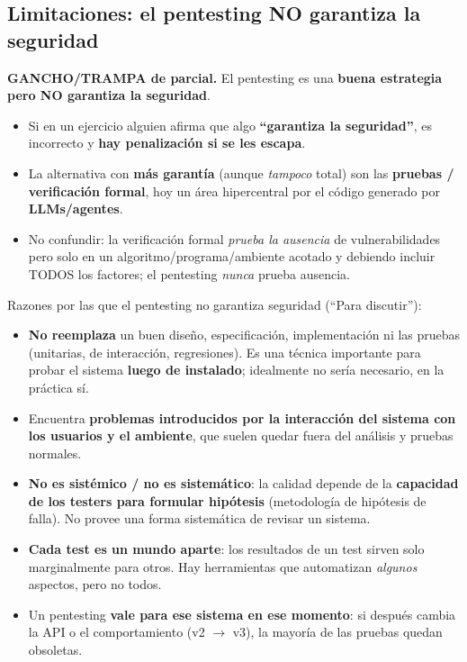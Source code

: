 \documentclass[../main.tex]{subfiles}
\begin{document}
\subsection{Limitaciones: el pentesting NO garantiza la seguridad}

\begin{examen}
\faExclam \textbf{GANCHO/TRAMPA de parcial.} El pentesting es una \textbf{buena estrategia
pero NO garantiza la seguridad}.
\begin{itemize}
    \item Si en un ejercicio alguien afirma que algo \textbf{``garantiza la seguridad''}, es
    incorrecto y \textbf{hay penalización si se les escapa}.
    \item La alternativa con \textbf{más garantía} (aunque \emph{tampoco} total) son las
    \textbf{pruebas / verificación formal}, hoy un área hipercentral por el código generado por
    \textbf{LLMs/agentes}.
    \item No confundir: la verificación formal \emph{prueba la ausencia} de vulnerabilidades
    pero solo en un algoritmo/programa/ambiente acotado y debiendo incluir TODOS los factores;
    el pentesting \emph{nunca} prueba ausencia.
\end{itemize}
\end{examen}

Razones por las que el pentesting no garantiza seguridad (``Para discutir''):
\begin{itemize}
    \item \textbf{No reemplaza} un buen diseño, especificación, implementación ni las pruebas
    (unitarias, de interacción, regresiones). Es una técnica importante para probar el sistema
    \textbf{luego de instalado}; idealmente no sería necesario, en la práctica sí.
    \item Encuentra \textbf{problemas introducidos por la interacción del sistema con los
    usuarios y el ambiente}, que suelen quedar fuera del análisis y pruebas normales.
    \item \textbf{No es sistémico / no es sistemático}: la calidad depende de la
    \textbf{capacidad de los testers para formular hipótesis} (metodología de hipótesis de
    falla). No provee una forma sistemática de revisar un sistema.
    \item \textbf{Cada test es un mundo aparte}: los resultados de un test sirven solo
    marginalmente para otros. Hay herramientas que automatizan \emph{algunos} aspectos, pero
    no todos.
    \item Un pentesting \textbf{vale para ese sistema en ese momento}: si después cambia la API
    o el comportamiento (v2 $\rightarrow$ v3), la mayoría de las pruebas quedan obsoletas.
\end{itemize}
\end{document}
